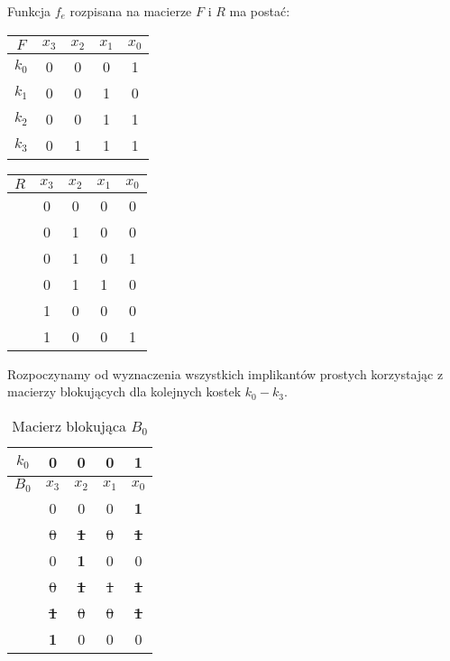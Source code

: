 \setcounter{implicant_counter}{0}

Funkcja $f_e$ rozpisana na macierze $F$ i $R$ ma postać:
\begin{center}
    \begin{tabular}[t]{ |c|c c c c| }
        \hline
        $F$ & $x_3$ & $x_2$ & $x_1$ & $x_0$ \\
        \hline
        $k_0$ & 0 & 0 & 0 & 1 \\
        $k_1$ & 0 & 0 & 1 & 0 \\
        $k_2$ & 0 & 0 & 1 & 1 \\
        $k_3$ & 0 & 1 & 1 & 1 \\
        \hline
    \end{tabular}
    \hspace{1cm}
    \begin{tabular}[t]{ |c|c c c c| }
        \hline
        $R$ & $x_3$ & $x_2$ & $x_1$ & $x_0$ \\
        \hline
        & 0 & 0 & 0 & 0 \\
        & 0 & 1 & 0 & 0 \\
        & 0 & 1 & 0 & 1 \\
        & 0 & 1 & 1 & 0 \\
        & 1 & 0 & 0 & 0 \\
        & 1 & 0 & 0 & 1 \\
        \hline
    \end{tabular}
\end{center}

Rozpoczynamy od wyznaczenia wszystkich implikantów prostych korzystając z macierzy blokujących dla kolejnych kostek
$k_0-k_3$.

\begin{table}[H]
    \centering
    \begin{tabular}[t]{ |c|c c c c| }
        \hline
        $k_0$ & 0 & 0 & 0 & 1 \\
        \hline\hline
        $B_0$ & $x_3$ & $x_2$ & $x_1$ & $x_0$ \\
        \hline
        & 0 & 0 & 0 & \textbf{1} \\
        & \sout{0} & \sout{\textbf{1}} & \sout{0} & \sout{\textbf{1}} \\
        & 0 & \textbf{1} & 0 & 0 \\
        & \sout{0} & \sout{\textbf{1}} & \sout{1} & \sout{\textbf{1}} \\
        & \sout{\textbf{1}} & \sout{0} & \sout{0} & \sout{\textbf{1}} \\
        & \textbf{1} & 0 & 0 & 0 \\
        \hline
    \end{tabular}
    \caption{Macierz blokująca $B_0$}\label{tab:b0f}
\end{table}

